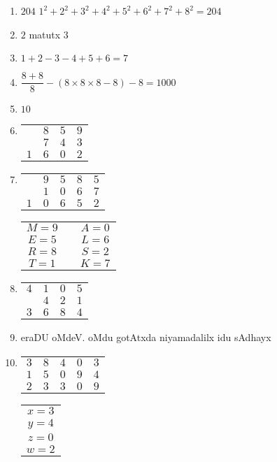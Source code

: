 \begin{enumerate}
\item $204$ \quad $1^2+2^2+3^2+4^2+5^2+6^2+7^2+8^2=204$

\item $2$ matutx $3$

\item $1+2-3-4+5+6 =7$

\item $\dfrac{8+8}{8} - (8 \times 8 \times 8 - 8) - 8 = 1000$

\item $10$

\item
\begin{tabular}[t]{cccc}
  &$8$&$5$&$9$\\
  &$7$&$4$&$3$\\\cline{1-4}
  $1$&$6$&$0$&$2$
\end{tabular}

\item
  \begin{tabular}[t]{ccccc}
    &$9$&$5$&$8$&$5$\\
    &$1$&$0$&$6$&$7$\\\cline{1-5}
    $1$&$0$&$6$&$5$&$2$
  \end{tabular} \qquad 
  \begin{tabular}[t]{ccc}
    $M=9$& \quad& $A=0$\\
    $E=5$& \quad& $L=6$\\
    $R=8$& \quad& $S=2$\\
    $T=1$& \quad& $K=7$
  \end{tabular}
  
\item
  \begin{tabular}[t]{cccc}
    $4$&$1$&$0$&$5$\\
    &$4$&$2$&$1$\\\cline{1-4}
    $3$&$6$&$8$&$4$
  \end{tabular}
  
  \eject
  
\item eraDU oMdeV. oMdu gotAtxda niyamadalilx idu sAdhayx

\item
  \begin{tabular}[t]{ccccc}
    $3$&$8$&$4$&$0$&$3$\\
    $1$&$5$&$0$&$9$&$4$\\\cline{1-5}
    $2$&$3$&$3$&$0$&$9$
  \end{tabular}\qquad
  \begin{tabular}[t]{c}
    $x=3$\\
    $y=4$\\
    $z=0$\\
    $w=2$
  \end{tabular}


\end{enumerate}
